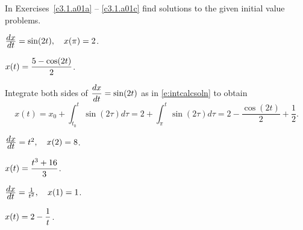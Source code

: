 \documentclass{ximera}
\begin{document}
\TEXER


\noindent In Exercises~\ref{c3.1.a01a} -- \ref{c3.1.a01c} find
solutions to the given initial value problems.
\begin{exercise} \label{c3.1.a01a}
$\frac{\displaystyle dx}{\displaystyle dt} = \sin(2t),\quad x(\pi) = 2$.

\begin{solution}

\ans $\displaystyle x(t) = \frac{5 - \cos(2t)}{2}$.

\soln Integrate both sides of $\displaystyle\frac{dx}{dt} = \sin(2t)$ as in
\eqref{e:intcalcsoln} to obtain
\[
x(t) = x_0 + \int_{t_0}^{t}\sin(2\tau)d\tau =
2 + \int_{\pi}^{t}\sin(2\tau)d\tau = 2 - \frac{\cos(2t)}{2} +
\frac{1}{2}.
\]

\end{solution}
\end{exercise}
\begin{exercise} \label{c3.1.a01b}
$\frac{\displaystyle dx}{\displaystyle dt} = t^2, \quad x(2) = 8$.

\begin{solution}
$\displaystyle x(t) = \frac{t^3 + 16}{3}$.

\end{solution}
\end{exercise}
\begin{exercise} \label{c3.1.a01c}
$\frac{\displaystyle dx}{\displaystyle dt} = \frac{1}{t^2},\quad x(1)=1$.

\begin{solution}
$\displaystyle x(t) = 2 - \frac{1}{t}$.

\end{solution}
\end{exercise}
\end{document}
